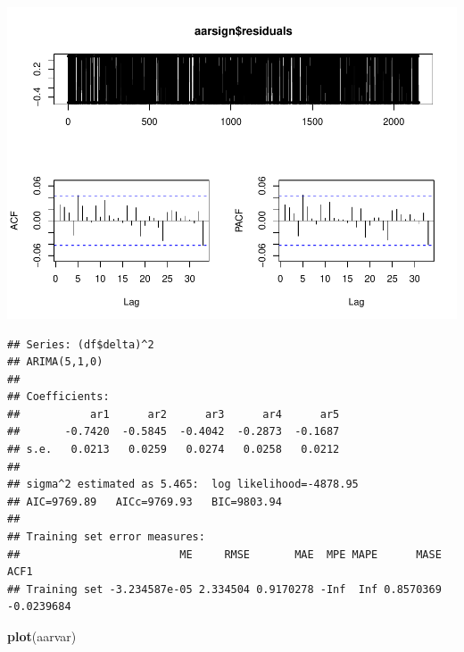 \documentclass[11pt, a4paper]{report}
\newenvironment{Shaded}{\begin{snugshade}}{\end{snugshade}}
\newcommand{\DataTypeTok}[1]{\textcolor[rgb]{0.13,0.29,0.53}{#1}}
\newcommand{\DecValTok}[1]{\textcolor[rgb]{0.00,0.00,0.81}{#1}}
\newcommand{\KeywordTok}[1]{\textcolor[rgb]{0.13,0.29,0.53}{\textbf{#1}}}
\newcommand{\NormalTok}[1]{#1}
\newcommand{\OperatorTok}[1]{\textcolor[rgb]{0.81,0.36,0.00}{\textbf{#1}}}
\newcommand{\StringTok}[1]{\textcolor[rgb]{0.31,0.60,0.02}{#1}}
\theoremstyle{plain}
\theoremstyle{plain}
\theoremstyle{remark}
\begin{document}
\begin{center}\includegraphics{Econo2_P1_files/figure-latex/auto arima-10} \end{center}

\begin{Shaded}
\end{Shaded}

\begin{verbatim}
## Series: (df$delta)^2 
## ARIMA(5,1,0) 
## 
## Coefficients:
##           ar1      ar2      ar3      ar4      ar5
##       -0.7420  -0.5845  -0.4042  -0.2873  -0.1687
## s.e.   0.0213   0.0259   0.0274   0.0258   0.0212
## 
## sigma^2 estimated as 5.465:  log likelihood=-4878.95
## AIC=9769.89   AICc=9769.93   BIC=9803.94
## 
## Training set error measures:
##                         ME     RMSE       MAE  MPE MAPE      MASE       ACF1
## Training set -3.234587e-05 2.334504 0.9170278 -Inf  Inf 0.8570369 -0.0239684
\end{verbatim}

\begin{Shaded}
\begin{Highlighting}[]
\KeywordTok{plot}\NormalTok{(aarvar)}
\end{Highlighting}
\end{Shaded}
\end{document}
